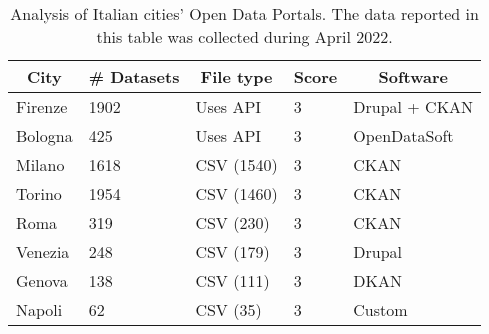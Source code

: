 \begin{table}[!ht]
  \onehalfspacing
  \centering
  \begin{tabular}{|l|l|l|l|l|}
    \hline
    \multicolumn{1}{|c|}{\textbf{City}} & \multicolumn{1}{c|}{\textbf{\# Datasets}} & \multicolumn{1}{c|}{\textbf{File type}} & \multicolumn{1}{c|}{\textbf{Score}} & \multicolumn{1}{c|}{\textbf{Software}} \\ \hline
    Firenze                   & 1902                                             & Uses \acs{API}                                       & 3                                   & Drupal + CKAN \\ \hline
    Bologna                   & 425                                              & Uses \acs{API}                                       & 3                                   & OpenDataSoft  \\ \hline
    Milano                    & 1618                                             & CSV (1540)                                           & 3                                   & CKAN  \\ \hline
    Torino                    & 1954                                             & CSV (1460)                                           & 3                                   & CKAN  \\ \hline
    Roma                      & 319                                              & CSV (230)                                            & 3                                   & CKAN  \\ \hline
    Venezia                   & 248                                              & CSV (179)                                            & 3                                   & Drupal  \\ \hline
    Genova                    & 138                                              & CSV (111)                                            & 3                                   & DKAN  \\ \hline
    Napoli                    & 62                                               & CSV (35)                                             & 3                                   & Custom  \\ \hline
  \end{tabular}
  \caption{Analysis of Italian cities' Open Data Portals. The data reported in this table was collected during April 2022.}
  \label{tab:italian-cities}
\end{table}

